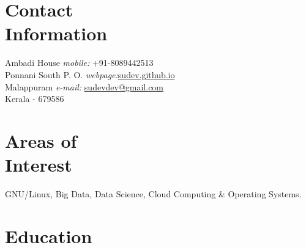 \documentclass[margin,line]{resume}
\begin{document}
\begin{resume}

    \section{\mysidestyle Contact\\Information}
    
        
    Ambadi House   \hfill \textit{mobile:} \hspace{9mm} 		+91-8089442513 \\ 
    Ponnani South P. O.	\hfill \textit{webpage:}\hspace{14mm}\href{http://sudev.github.io}{sudev.github.io}\\
    Malappuram \hfill 	\textit{e-mail:} \hspace{3.6mm}\href{mailto:sudevdev@gmail.com}{sudevdev@gmail.com}     \\
    Kerala - 679586
			
        \vspace{-2.5mm}
        
        \vspace{3mm}
%
					
    \section{\mysidestyle Areas of\\Interest}

   GNU/Linux, Big Data, Data Science, Cloud Computing \& Operating Systems.
\vspace{3mm}


    \section{\mysidestyle Education}


\end{resume}
\end{document}
